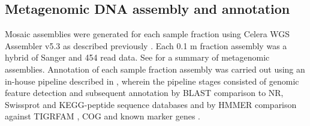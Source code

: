 \subsection{Metagenomic DNA assembly and annotation}
Mosaic assemblies were generated for each sample fraction using Celera \ac{WGS} Assembler v5.3 \cite{Myers2000} as described previously \cite{Ng2010a, Lauro2011}. 
Each 0.1 \textmu{}m fraction assembly was a hybrid of Sanger and 454 read data. 
See  for a summary of metagenomic assemblies.
Annotation of each sample fraction assembly was carried out using an in-house pipeline described in \citet{DeMaere2011}, wherein the pipeline stages consisted of genomic feature detection and subsequent annotation by \ac{BLAST} comparison to \ac{NR}, Swissprot and \ac{KEGG}-peptide sequence databases and by \ac{HMMER} comparison against \ac{TIGRFAM} \cite{Haft2001}, \ac{COG} \cite{Tatusov1997, Tatusov2003} and known marker genes \cite{vonMering2007}. 

